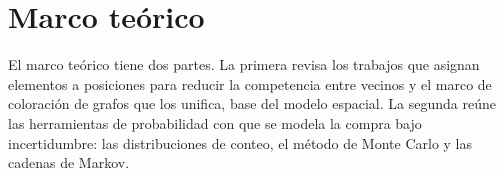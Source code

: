 \section{Marco teórico}
\label{sec:marco-teorico}

El marco teórico tiene dos partes. La primera revisa los trabajos que asignan elementos a posiciones para reducir la competencia entre vecinos y el marco de coloración de grafos que los unifica, base del modelo espacial. La segunda reúne las herramientas de probabilidad con que se modela la compra bajo incertidumbre: las distribuciones de conteo, el método de Monte Carlo y las cadenas de Markov.



